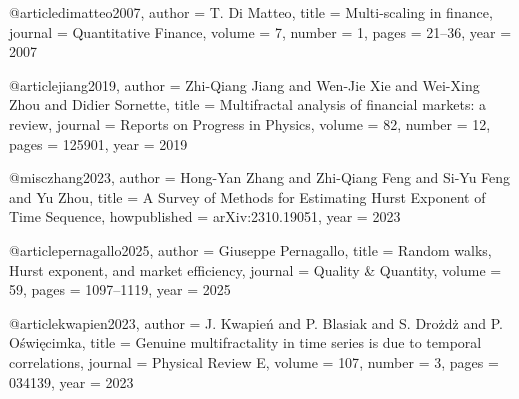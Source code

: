 @article{dimatteo2007,
  author  = {T. Di Matteo},
  title   = {Multi-scaling in finance},
  journal = {Quantitative Finance},
  volume  = {7},
  number  = {1},
  pages   = {21--36},
  year    = {2007}
}

@article{jiang2019,
  author  = {Zhi-Qiang Jiang and Wen-Jie Xie and Wei-Xing Zhou and Didier Sornette},
  title   = {Multifractal analysis of financial markets: a review},
  journal = {Reports on Progress in Physics},
  volume  = {82},
  number  = {12},
  pages   = {125901},
  year    = {2019}
}

@misc{zhang2023,
  author  = {Hong-Yan Zhang and Zhi-Qiang Feng and Si-Yu Feng and Yu Zhou},
  title   = {A Survey of Methods for Estimating Hurst Exponent of Time Sequence},
  howpublished = {arXiv:2310.19051},
  year    = {2023}
}

@article{pernagallo2025,
  author  = {Giuseppe Pernagallo},
  title   = {Random walks, Hurst exponent, and market efficiency},
  journal = {Quality \& Quantity},
  volume  = {59},
  pages   = {1097--1119},
  year    = {2025}
}

@article{kwapien2023,
  author  = {J. Kwapień and P. Blasiak and S. Drożdż and P. Oświęcimka},
  title   = {Genuine multifractality in time series is due to temporal correlations},
  journal = {Physical Review E},
  volume  = {107},
  number  = {3},
  pages   = {034139},
  year    = {2023}
}
